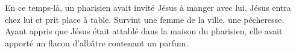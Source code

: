 En ce temps-là, un pharisien avait invité Jésus à manger avec lui.
	Jésus entra chez lui et prit place à table.
Survint une femme de la ville, une pécheresse.
Ayant appris que Jésus était attablé dans la maison du pharisien,
	elle avait apporté un flacon d’albâtre contenant un parfum.
